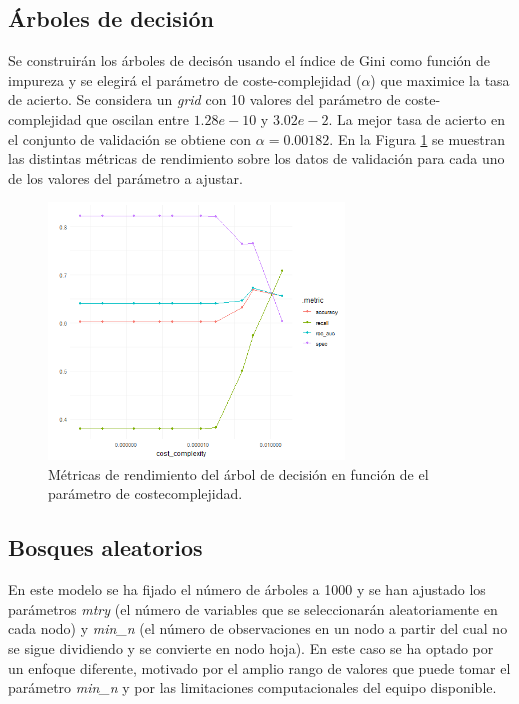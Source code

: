 \documentclass[12pt,a4paper,]{book}
\numberwithin{dummy}{section}
\theoremstyle{ocrenumbox}
\theoremstyle{blacknumex}
\theoremstyle{blacknumbox}
\theoremstyle{ocrenum}
\theoremstyle{ocrenum}
\begin{document}
\hypertarget{uxe1rboles-de-decisiuxf3n}{%
\subsection{Árboles de decisión}\label{uxe1rboles-de-decisiuxf3n}}

Se construirán los árboles de decisón usando el índice de Gini como
función de impureza y se elegirá el parámetro de coste-complejidad
(\(\alpha\)) que maximice la tasa de acierto. Se considera un
\emph{grid} con 10 valores del parámetro de coste-complejidad que
oscilan entre \(1.28e-10\) y \(3.02e- 2\). La mejor tasa de acierto en
el conjunto de validación se obtiene con \(\alpha = 0.00182\). En la
Figura \ref{fig:dt_tuningplot} se muestran las distintas métricas de
rendimiento sobre los datos de validación para cada uno de los valores
del parámetro a ajustar.

\begin{figure}[h!]
\centering
\includegraphics[width =0.7\textwidth]{graficos/dt_tuningplot.png}
\caption{Métricas de rendimiento del árbol de decisión en función de el parámetro de coste\-complejidad.}
\label{fig:dt_tuningplot}
\end{figure}

\hypertarget{bosques-aleatorios}{%
\subsection{Bosques aleatorios}\label{bosques-aleatorios}}

En este modelo se ha fijado el número de árboles a 1000 y se han
ajustado los parámetros \emph{mtry} (el número de variables que se
seleccionarán aleatoriamente en cada nodo) y \emph{min\_n} (el número de
observaciones en un nodo a partir del cual no se sigue dividiendo y se
convierte en nodo hoja). En este caso se ha optado por un enfoque
diferente, motivado por el amplio rango de valores que puede tomar el
parámetro \emph{min\_n} y por las limitaciones computacionales del
equipo disponible.
\end{document}
